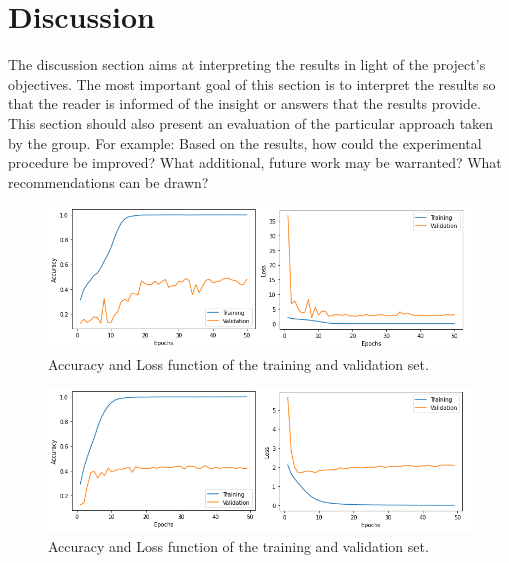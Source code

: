 \section{Discussion}
The discussion section aims at interpreting the results in light of the project's objectives.
The most important goal of this section is to interpret the results so that the reader is informed of the insight or answers that the results provide.
This section should also present an evaluation of the particular approach taken by the group.
For example: Based on the results, how could the experimental procedure be improved?
What additional, future work may be warranted?
What recommendations can be drawn?


\begin{figure}[ht]
\centering
\includegraphics[scale=0.6]{images/2021-val-train.png}
\caption{Accuracy and Loss function of the training and validation set.}
\label{fig:GP_Acq}
\end{figure}


\begin{figure}[ht]
\centering
\includegraphics[scale=0.6]{images/tuned-val-train.png}
\caption{Accuracy and Loss function of the training and validation set.}
\label{fig:GP_Acq}
\end{figure}
